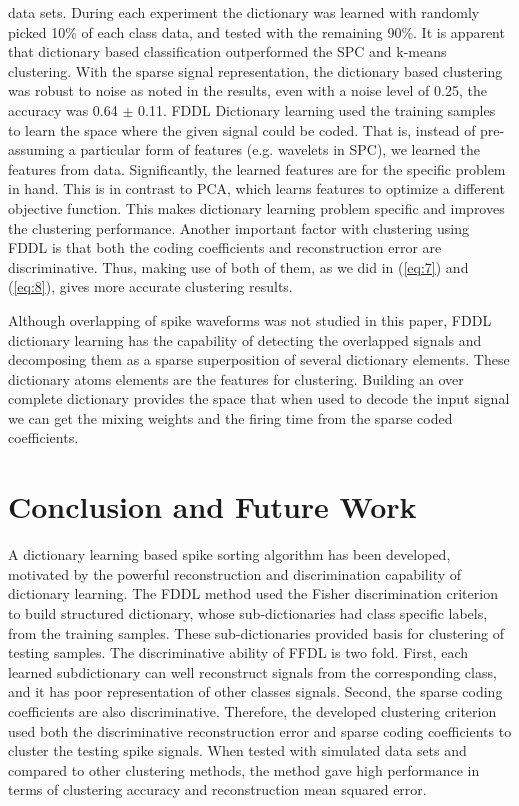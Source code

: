 \documentclass[conference]{IEEEtran}
\begin{document}
	data sets. During each experiment the dictionary was learned with randomly picked 10\% of each class data, and tested with the remaining 90\%. It is apparent that dictionary based classification outperformed the SPC and k-means clustering. With the sparse signal representation, the dictionary based clustering was robust to noise as noted in the results, even with a noise level of 0.25, the accuracy was 0.64 $\pm$ 0.11. FDDL Dictionary learning used the training samples to learn the space where the given signal could be coded. That is, instead of pre-assuming a particular form of features (e.g. wavelets in SPC), we learned the features from data. Significantly, the learned features are for the specific problem in hand. This is in contrast to PCA, which learns features to optimize a different objective function. This makes dictionary learning problem specific and improves the clustering performance. Another important factor with clustering using FDDL is that both the coding coefficients and reconstruction error are discriminative. Thus, making use of both of them, as we did in (\ref{eq:7}) and (\ref{eq:8}), gives more accurate clustering results.
	
	Although overlapping of spike waveforms was not studied in this paper, FDDL dictionary learning has the capability of detecting the overlapped signals and decomposing them as a sparse superposition of several dictionary elements. These dictionary atoms elements are the features for clustering. Building an over complete dictionary \cite{lewicki2000learning} provides the space that when used to decode the input signal we can get the mixing weights and the firing time from the sparse coded coefficients.
	
	\section{Conclusion and Future Work} \label{sec:conc_and_fut}
	A dictionary learning based spike sorting algorithm has been developed, motivated by the powerful reconstruction and discrimination capability of dictionary learning. The FDDL method used the Fisher discrimination criterion to build structured dictionary, whose sub-dictionaries had class specific labels, from the training samples. These sub-dictionaries provided basis for clustering of testing samples. The discriminative ability of FFDL is two fold. First, each learned subdictionary can well reconstruct signals from the corresponding class, and it has poor representation of other classes signals. Second, the sparse coding coefficients are also discriminative. Therefore, the developed clustering criterion used both the discriminative reconstruction error and sparse coding coefficients to cluster the testing spike signals. When tested with simulated data sets and compared to other clustering methods, the method gave high performance in terms of clustering accuracy and reconstruction mean squared error.
\end{document}
